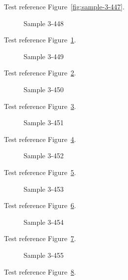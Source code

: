 Test reference Figure~\ref{fig:sample-3-447}.

\begin{figure}[tbhp]
\caption{Sample 3-448}
\label{fig:sample-3-448}
\end{figure}

Test reference Figure~\ref{fig:sample-3-448}.

\begin{figure}[tbhp]
\caption{Sample 3-449}
\label{fig:sample-3-449}
\end{figure}

Test reference Figure~\ref{fig:sample-3-449}.

\begin{figure}[tbhp]
\caption{Sample 3-450}
\label{fig:sample-3-450}
\end{figure}

Test reference Figure~\ref{fig:sample-3-450}.

\begin{figure}[tbhp]
\caption{Sample 3-451}
\label{fig:sample-3-451}
\end{figure}

Test reference Figure~\ref{fig:sample-3-451}.

\begin{figure}[tbhp]
\caption{Sample 3-452}
\label{fig:sample-3-452}
\end{figure}

Test reference Figure~\ref{fig:sample-3-452}.

\begin{figure}[tbhp]
\caption{Sample 3-453}
\label{fig:sample-3-453}
\end{figure}

Test reference Figure~\ref{fig:sample-3-453}.

\begin{figure}[tbhp]
\caption{Sample 3-454}
\label{fig:sample-3-454}
\end{figure}

Test reference Figure~\ref{fig:sample-3-454}.

\begin{figure}[tbhp]
\caption{Sample 3-455}
\label{fig:sample-3-455}
\end{figure}

Test reference Figure~\ref{fig:sample-3-455}.

